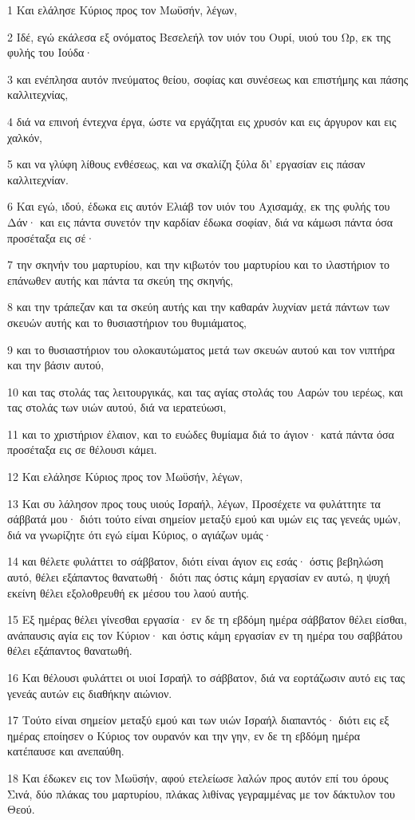 \par 1 Και ελάλησε Κύριος προς τον Μωϋσήν, λέγων,
\par 2 Ιδέ, εγώ εκάλεσα εξ ονόματος Βεσελεήλ τον υιόν του Ουρί, υιού του Ωρ, εκ της φυλής του Ιούδα·
\par 3 και ενέπλησα αυτόν πνεύματος θείου, σοφίας και συνέσεως και επιστήμης και πάσης καλλιτεχνίας,
\par 4 διά να επινοή έντεχνα έργα, ώστε να εργάζηται εις χρυσόν και εις άργυρον και εις χαλκόν,
\par 5 και να γλύφη λίθους ενθέσεως, και να σκαλίζη ξύλα δι' εργασίαν εις πάσαν καλλιτεχνίαν.
\par 6 Και εγώ, ιδού, έδωκα εις αυτόν Ελιάβ τον υιόν του Αχισαμάχ, εκ της φυλής του Δάν· και εις πάντα συνετόν την καρδίαν έδωκα σοφίαν, διά να κάμωσι πάντα όσα προσέταξα εις σέ·
\par 7 την σκηνήν του μαρτυρίου, και την κιβωτόν του μαρτυρίου και το ιλαστήριον το επάνωθεν αυτής και πάντα τα σκεύη της σκηνής,
\par 8 και την τράπεζαν και τα σκεύη αυτής και την καθαράν λυχνίαν μετά πάντων των σκευών αυτής και το θυσιαστήριον του θυμιάματος,
\par 9 και το θυσιαστήριον του ολοκαυτώματος μετά των σκευών αυτού και τον νιπτήρα και την βάσιν αυτού,
\par 10 και τας στολάς τας λειτουργικάς, και τας αγίας στολάς του Ααρών του ιερέως, και τας στολάς των υιών αυτού, διά να ιερατεύωσι,
\par 11 και το χριστήριον έλαιον, και το ευώδες θυμίαμα διά το άγιον· κατά πάντα όσα προσέταξα εις σε θέλουσι κάμει.
\par 12 Και ελάλησε Κύριος προς τον Μωϋσήν, λέγων,
\par 13 Και συ λάλησον προς τους υιούς Ισραήλ, λέγων, Προσέχετε να φυλάττητε τα σάββατά μου· διότι τούτο είναι σημείον μεταξύ εμού και υμών εις τας γενεάς υμών, διά να γνωρίζητε ότι εγώ είμαι Κύριος, ο αγιάζων υμάς·
\par 14 και θέλετε φυλάττει το σάββατον, διότι είναι άγιον εις εσάς· όστις βεβηλώση αυτό, θέλει εξάπαντος θανατωθή· διότι πας όστις κάμη εργασίαν εν αυτώ, η ψυχή εκείνη θέλει εξολοθρευθή εκ μέσου του λαού αυτής.
\par 15 Εξ ημέρας θέλει γίνεσθαι εργασία· εν δε τη εβδόμη ημέρα σάββατον θέλει είσθαι, ανάπαυσις αγία εις τον Κύριον· και όστις κάμη εργασίαν εν τη ημέρα του σαββάτου θέλει εξάπαντος θανατωθή.
\par 16 Και θέλουσι φυλάττει οι υιοί Ισραήλ το σάββατον, διά να εορτάζωσιν αυτό εις τας γενεάς αυτών εις διαθήκην αιώνιον.
\par 17 Τούτο είναι σημείον μεταξύ εμού και των υιών Ισραήλ διαπαντός· διότι εις εξ ημέρας εποίησεν ο Κύριος τον ουρανόν και την γην, εν δε τη εβδόμη ημέρα κατέπαυσε και ανεπαύθη.
\par 18 Και έδωκεν εις τον Μωϋσήν, αφού ετελείωσε λαλών προς αυτόν επί του όρους Σινά, δύο πλάκας του μαρτυρίου, πλάκας λιθίνας γεγραμμένας με τον δάκτυλον του Θεού.


